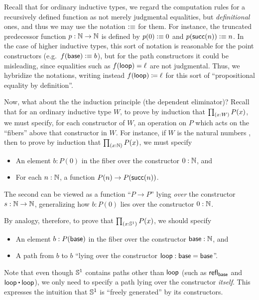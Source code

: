 \begin{rmk}\label{rmk:defid}
Recall that for ordinary inductive types, we regard the computation rules for a recursively defined function as not merely judgmental equalities, but \emph{definitional} ones, and thus we may use the notation $\vcentcolon\equiv$ for them.
For instance, the truncated predecessor function $p:\mathbb{N}\to\mathbb{N}$ is defined by $p(0)\vcentcolon\equiv 0$ and $p(\mathsf{succ}(n))\vcentcolon\equiv n$.
In the case of higher inductive types, this sort of notation is reasonable for the point constructors (e.g.\ $f(\mathsf{base})\vcentcolon\equiv b$), but for the path constructors it could be misleading, since equalities such as ${f}\mathopen{}\left({\mathsf{loop}}\right)\mathclose{} = \ell$ are not judgmental.
Thus, we hybridize the notations, writing instead ${f}\mathopen{}\left({\mathsf{loop}}\right)\mathclose{} \coloneqq \ell$ for this sort of ``propositional equality by definition''.
\end{rmk}

%
%
Now, what about the the induction principle (the dependent eliminator)?
Recall that for an ordinary inductive type $W$, to prove by induction that $\prd{x:W} P(x)$, we must specify, for each constructor of $W$, an operation on $P$ which acts on the ``fibers'' above that constructor in $W$.
For instance, if $W$ is the natural numbers \nat, then to prove by induction that $\prd{x:\nat} P(x)$, we must specify
\begin{itemize}
\item An element $b:P(0)$ in the fiber over the constructor $0:\mathbb{N}$, and
\item For each $n:\mathbb{N}$, a function $P(n) \to P(\mathsf{succ}(n))$.
\end{itemize}
The second can be viewed as a function ``$P\to P$'' lying \emph{over} the constructor $s:\mathbb{N}\to\mathbb{N}$, generalizing how $b:P(0)$ lies over the constructor $0:\mathbb{N}$.

By analogy, therefore, to prove that $\prd{x:\Sn^1} P(x)$, we should specify
\begin{itemize}
\item An element $b:P(\mathsf{base})$ in the fiber over the constructor $\mathsf{base}:\mathbb{N}$, and
\item A path from $b$ to $b$ ``lying over the constructor $\mathsf{loop}:\mathsf{base}=\mathsf{base}$''.
\end{itemize}
Note that even though $\mathbb{S}^1$ contains paths other than $\mathsf{loop}$ (such as $\mathsf{refl}_{\mathsf{base}}$ and $\lloop\ct\lloop$), we only need to specify a path lying over the constructor \emph{itself}.
This expresses the intuition that $\mathbb{S}^1$ is ``freely generated'' by its constructors.

